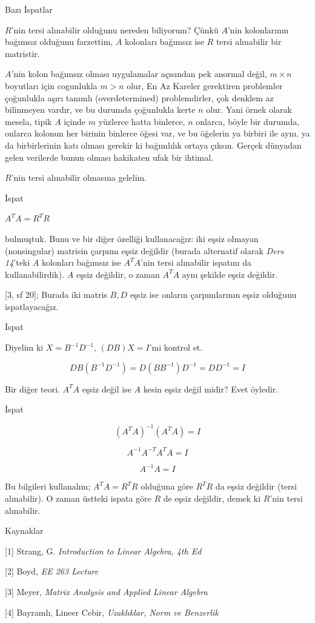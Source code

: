 \documentclass[12pt,fleqn]{article}\usepackage{../../common}
\begin{document}
Bazı İspatlar

$R$'nin tersi alınabilir olduğunu nereden biliyorum? Çünkü $A$'nin
kolonlarının bağımsız olduğunu farzettim, $A$ kolonları bağımsız ise
$R$ tersi alınabilir bir matristir. 

$A$'nin kolon bağımsız olması uygulamalar açısından pek anormal değil, $m
\times n$ boyutları için cogunlukla $m > n$ olur, En Az Kareler gerektiren
problemler çoğunlukla aşırı tanımlı (overdetermined) problemdirler, çok
denklem az bilinmeyen vardır, ve bu durumda çoğunlukla kerte $n$ olur. Yani
örnek olarak mesela, tipik $A$ içinde $m$ yüzlerce hatta binlerce, $n$
onlarca, böyle bir durumda, onlarca kolonun her birinin binlerce öğesi var,
ve bu öğelerin ya birbiri ile aynı, ya da birbirlerinin katı olması gerekir
ki bağımlılık ortaya çıksın. Gerçek dünyadan gelen verilerde bunun olması
hakikaten ufak bir ihtimal.

$R$'nin tersi alınabilir olmasına gelelim.

İspat

$A^TA = R^TR$

bulmuştuk. Bunu ve bir diğer özelliği kullanacağız: iki eşsiz olmayan
(nonsingular) matrisin çarpımı eşsiz değildir (burada alternatif olarak
{\em Ders 14}'teki $A$ kolonları bağımsız ise $A^TA$'nin tersi alınabilir
ispatını da kullanabilirdik). $A$ eşsiz değildir, o zaman $A^TA$ aynı
şekilde eşsiz değildir.

[3, sf 20]; Burada iki matris $B,D$ eşsiz ise onların çarpımlarının eşsiz
olduğunu ispatlayacağız. 

İspat

Diyelim ki $X=B^{-1}D^{-1}$, $(DB)X=I$'mi kontrol et.

$$ DB (B^{-1}D^{-1}) = D(BB^{-1})D^{-1} = DD^{-1} = I $$

Bir diğer teori. $A^TA$ eşsiz değil ise $A$ kesin eşsiz değil midir? Evet
öyledir.

İspat

$$ (A^TA)^{-1} (A^TA)= I $$

$$ A^{-1}A^{-T}A^TA = I$$

$$ A^{-1}A = I$$

Bu bilgileri kullanalım; $A^TA = R^TR$ olduğuna göre $R^TR$ da eşsiz
değildir (tersi alınabilir). O zaman üstteki ispata göre $R$ de eşsiz
değildir, demek ki $R$'nin tersi alınabilir.

Kaynaklar 

[1] Strang, G. {\em Introduction to Linear Algebra, 4th Ed}

[2] Boyd, {\em EE 263 Lecture}

[3] Meyer, {\em Matrix Analysis and Applied Linear Algebra}

[4] Bayramlı, Lineer Cebir, {\em Uzaklıklar, Norm ve Benzerlik}
\end{document}
